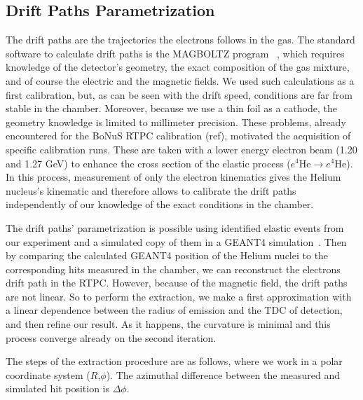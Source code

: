 \documentclass[twocolumn,showpacs,superscriptaddress,groupedaddress]{revtex4}
\begin{document}
   
\subsection{Drift Paths Parametrization}

The drift paths are the trajectories the electrons follows in the gas. The 
standard software to calculate drift paths is the MAGBOLTZ program 
~\cite{MAGBOLTZ}, which requires knowledge of the detector's 
geometry, the exact composition of the gas mixture, and of course the electric 
and the magnetic fields. We used such calculations as a first calibration, but, 
as can be seen with the drift speed, conditions are far from stable in the 
chamber. Moreover, because we use a thin foil as a cathode, the geometry 
knowledge is limited to millimeter precision. These problems, already 
encountered for the BoNuS RTPC calibration (ref), motivated the 
acquisition of specific calibration runs. These are taken with a lower energy 
electron beam (1.20 and 1.27 GeV) to enhance the cross section of the elastic 
process ($e^{4}$He$\rightarrow e^{4}$He). In this process, measurement of only the 
electron kinematics gives the Helium nucleus's kinematic and therefore allows 
to calibrate the drift paths independently of our knowledge of the exact 
conditions in the chamber.

The drift paths' parametrization is possible using identified elastic events 
from our experiment and a simulated copy of them in a GEANT4 
simulation~\cite{GEANT4}. Then by comparing the calculated GEANT4 position of 
the Helium nuclei to the corresponding hits measured in the chamber, we 
can reconstruct the electrons drift path in the RTPC. However, because of the 
magnetic field, the drift paths are not linear. So to perform the extraction, 
we make a first approximation with a linear dependence between the radius of 
emission and the TDC of detection, and then refine our result. As it happens, 
the curvature is minimal and this process converge already on the second 
iteration. 

The steps of the extraction procedure are as follows, where we work
in a polar coordinate system ($R$,$\phi$).  The azimuthal difference between
the measured and simulated hit position is $\Delta\phi$.
\end{document}

